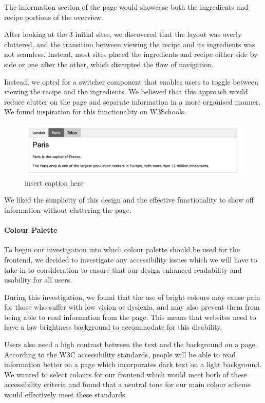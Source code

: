 \documentclass{article}
\begin{document}
The information section of the page would showcase both the ingredients and recipe portions of the overview.

After looking at the 3 initial sites, we discovered that the layout was overly cluttered, and the transition between viewing the recipe and its ingredients was not seamless. Instead, most sites placed the ingredients and recipe either side by side or one after the other, which disrupted the flow of navigation.

Instead, we opted for a switcher component that enables users to toggle between viewing the recipe and the ingredients. We believed that this approach would reduce clutter on the page and separate information in a more organised manner. We found inspiration for this functionality on W3Schools.

\begin{figure}[htbp]
  \includegraphics[width=1.0\textwidth]{assets/W3Schools tabbed component.png}
  \centering
  \caption{insert caption here}
\end{figure}

We liked the simplicity of this design and the effective functionality to show off information without cluttering the page.

\paragraph{Colour Palette}
To begin our investigation into which colour palette should be used for the frontend, we decided to investigate any accessibility issues which we will have to take in to consideration to ensure that our design enhanced readability and usability for all users.

During this investigation, we found that the use of bright colours may cause pain for those who suffer with low vision or dyslexia, and may also prevent them from being able to read information from the page. This means that websites need to have a low brightness background to accommodate for this disability.

Users also need a high contrast between the text and the background on a page. According to the W3C accessibility standards, people will be able to read information better on a page which incorporates dark text on a light background. We wanted to select colours for our frontend which would meet both of these accessibility criteria and found that a neutral tone for our main colour scheme would effectively meet these standards.
\end{document}
